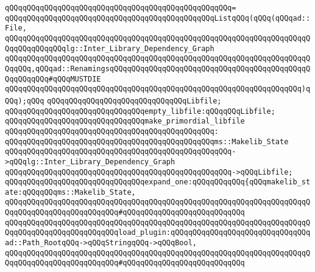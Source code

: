\verb|qQQqqQQqqQQqqQQqqQQqqQQqqQQqqQQqqQQqqQQqqQQqqQQqqQQq=|\newline
\verb|qQQqqQQqqQQqqQQqqQQqqQQqqQQqqQQqqQQqqQQqqQQqqQQqListqQQq(qQQq(qQQqad::File,|\newline
\verb|qQQqqQQqqQQqqQQqqQQqqQQqqQQqqQQqqQQqqQQqqQQqqQQqqQQqqQQqqQQqqQQqqQQqqQQqqQQqqQQqqQQqlg::Inter_Library_Dependency_Graph|\newline
\verb|qQQqqQQqqQQqqQQqqQQqqQQqqQQqqQQqqQQqqQQqqQQqqQQqqQQqqQQqqQQqqQQqqQQqqQQqqQQq,qQQqad::RenamingsqQQqqQQqqQQqqQQqqQQqqQQqqQQqqQQqqQQqqQQqqQQqqQQqqQQqqQQq#qQQqMUSTDIE|\newline
\verb|qQQqqQQqqQQqqQQqqQQqqQQqqQQqqQQqqQQqqQQqqQQqqQQqqQQqqQQqqQQqqQQqqQQq)qQQq);qQQq|\newline
\newline
\newline
\verb|qQQqqQQqqQQqqQQqqQQqqQQqqQQqqQQqLibfile;|\newline
\newline
\newline
\verb|qQQqqQQqqQQqqQQqqQQqqQQqqQQqqQQqempty_libfile:qQQqqQQqLibfile;|\newline
\newline
\newline
\verb|qQQqqQQqqQQqqQQqqQQqqQQqqQQqqQQqmake_primordial_libfile|\newline
\verb|qQQqqQQqqQQqqQQqqQQqqQQqqQQqqQQqqQQqqQQqqQQqqQQq:|\newline
\verb|qQQqqQQqqQQqqQQqqQQqqQQqqQQqqQQqqQQqqQQqqQQqqQQqms::Makelib_State|\newline
\verb|qQQqqQQqqQQqqQQqqQQqqQQqqQQqqQQqqQQqqQQqqQQqqQQqqQQq->qQQqlg::Inter_Library_Dependency_Graph|\newline
\verb|qQQqqQQqqQQqqQQqqQQqqQQqqQQqqQQqqQQqqQQqqQQqqQQqqQQq->qQQqLibfile;|\newline
\newline
\newline
\verb|qQQqqQQqqQQqqQQqqQQqqQQqqQQqqQQqexpand_one:qQQqqQQqqQQq{qQQqmakelib_state:qQQqqQQqms::Makelib_State,|\newline
\verb|qQQqqQQqqQQqqQQqqQQqqQQqqQQqqQQqqQQqqQQqqQQqqQQqqQQqqQQqqQQqqQQqqQQqqQQqqQQqqQQqqQQqqQQqqQQqqQQq#qQQqqQQqqQQqqQQqqQQqqQQqqQQq|\newline
\verb|qQQqqQQqqQQqqQQqqQQqqQQqqQQqqQQqqQQqqQQqqQQqqQQqqQQqqQQqqQQqqQQqqQQqqQQqqQQqqQQqqQQqqQQqqQQqqQQqload_plugin:qQQqqQQqqQQqqQQqqQQqqQQqqQQqqQQqad::Path_RootqQQq->qQQqStringqQQq->qQQqBool,|\newline
\verb|qQQqqQQqqQQqqQQqqQQqqQQqqQQqqQQqqQQqqQQqqQQqqQQqqQQqqQQqqQQqqQQqqQQqqQQqqQQqqQQqqQQqqQQqqQQqqQQq#qQQqqQQqqQQqqQQqqQQqqQQqqQQq|\newline

